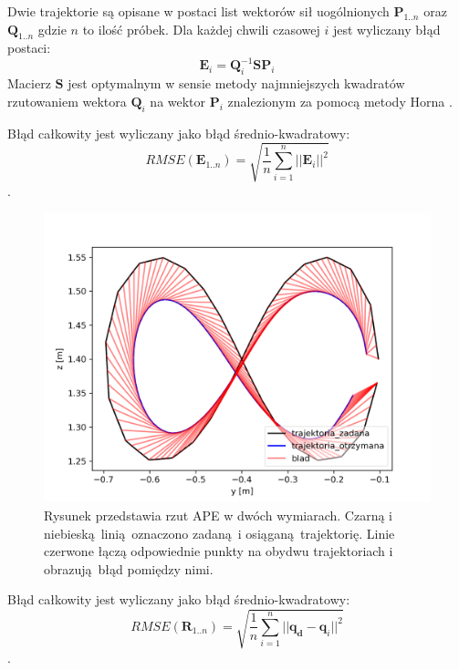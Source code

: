 Dwie trajektorie są opisane w postaci list wektorów sił uogólnionych $\boldsymbol{P}_{1..n}$ oraz $\boldsymbol{Q}_{1..n}$ gdzie $n$ to ilość próbek. Dla każdej chwili czasowej $i$ jest wyliczany błąd postaci:
\begin{equation}
\boldsymbol{E}_i = \boldsymbol{Q}_i^{-1}\boldsymbol{S}\boldsymbol{P}_i
\end{equation}
Macierz $\boldsymbol{S}$ jest optymalnym w sensie metody najmniejszych kwadratów rzutowaniem wektora $\boldsymbol{Q}_i$ na wektor $\boldsymbol{P}_i$ znalezionym za pomocą metody Horna \cite{bib:horn}. 

Błąd całkowity jest wyliczany jako błąd średnio-kwadratowy:
\begin{equation}
RMSE(\boldsymbol{E}_{1..n}) = \sqrt{\frac{1}{n}\sum_{i=1}^{n}||\boldsymbol{E}_i||^2}
\end{equation}.



\begin{figure}
	\centering
		\includegraphics[width=.45\textwidth]{../../velma/przerobione_testy/out/osemka/yz_ate_plot_podnoszenie_miekki_bez_brak.png}
		\caption{Rysunek przedstawia rzut APE w dwóch wymiarach. Czarną i niebieską linią oznaczono zadaną i osiąganą trajektorię. Linie czerwone łączą odpowiednie punkty na obydwu trajektoriach i obrazują błąd pomiędzy nimi.}
		\label{fig:przykl_ape}
\end{figure}




Błąd całkowity jest wyliczany jako błąd średnio-kwadratowy:
\begin{equation}
RMSE(\boldsymbol{R}_{1..n}) = \sqrt{\frac{1}{n}\sum_{i=1}^{n}||\boldsymbol{q_d}-\boldsymbol{q}_i||^2}
\end{equation}.

